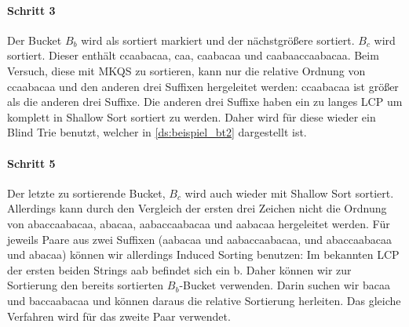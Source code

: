 \paragraph{Schritt 3} Der Bucket $B_b$ wird als sortiert markiert und der nächstgrößere sortiert.
$B_c$ wird sortiert.
Dieser enthält \glqq ccaabacaa\grqq, \glqq caa\grqq, \glqq caabacaa\grqq{} und \glqq caabaaccaabacaa\grqq.
Beim Versuch, diese mit MKQS zu sortieren, kann nur die relative Ordnung von \glqq ccaabacaa\grqq{} und den anderen drei Suffixen hergeleitet werden: \glqq ccaabacaa\grqq{} ist größer als die anderen drei Suffixe.
Die anderen drei Suffixe haben ein zu langes LCP um komplett in Shallow Sort sortiert zu werden.
Daher wird für diese wieder ein Blind Trie benutzt, welcher in \cref{ds:beispiel_bt2} dargestellt ist.


\paragraph{Schritt 5} Der letzte zu sortierende Bucket, $B_c$ wird auch wieder mit Shallow Sort sortiert.
Allerdings kann durch den Vergleich der ersten drei Zeichen nicht die Ordnung von \glqq abaccaabacaa\grqq, \glqq abacaa\grqq, \glqq aabaccaabacaa\grqq{} und \glqq aabacaa\grqq{} hergeleitet werden.
Für jeweils Paare aus zwei Suffixen (\glqq aabacaa\grqq{} und \glqq aabaccaabacaa\grqq, und \glqq abaccaabacaa\grqq{} und abacaa) können wir allerdings Induced Sorting benutzen:
Im bekannten LCP der ersten beiden Strings \glqq aab\grqq{} befindet sich ein \glqq b\grqq.
Daher können wir zur Sortierung den bereits sortierten $B_b$-Bucket verwenden.
Darin suchen wir \glqq bacaa\grqq{} und \glqq baccaabacaa\grqq{} und können daraus die relative Sortierung herleiten.
Das gleiche Verfahren wird für das zweite Paar verwendet.

